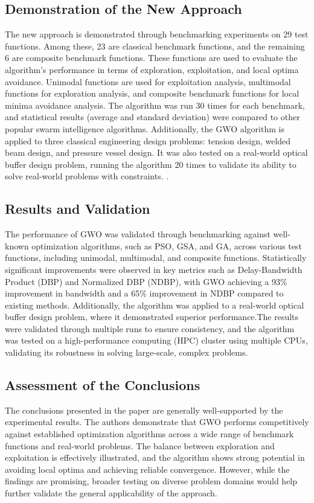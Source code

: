 \documentclass[a4paper, 12pt]{extarticle}
\begin{document}
\subsection{Demonstration of the New Approach}
The new approach is demonstrated through benchmarking experiments on 29 test functions. Among these, 23 are classical benchmark functions, and the remaining 6 are composite benchmark functions. These functions are used to evaluate the algorithm’s performance in terms of exploration, exploitation, and local optima avoidance. Unimodal functions are used for exploitation analysis, multimodal functions for exploration analysis, and composite benchmark functions for local minima avoidance analysis. The algorithm was run 30 times for each benchmark, and statistical results (average and standard deviation) were compared to other popular swarm intelligence algorithms.   Additionally, the GWO algorithm is applied to three classical engineering design problems: tension design, welded beam design, and pressure vessel design. It was also tested on a real-world optical buffer design problem, running the algorithm 20 times to validate its ability to solve real-world problems with constraints. \cite{mirjalili2016multi}.

\subsection{Results and Validation}
The performance of GWO was validated through benchmarking against well-known optimization algorithms, such as PSO, GSA, and GA, across various test functions, including unimodal, multimodal, and composite functions. Statistically significant improvements were observed in key metrics such as Delay-Bandwidth Product (DBP) and Normalized DBP (NDBP), with GWO achieving a 93\% improvement in bandwidth and a 65\% improvement in NDBP compared to existing methods. Additionally, the algorithm was applied to a real-world optical buffer design problem, where it demonstrated superior performance.The results were validated through multiple runs to ensure consistency, and the algorithm was tested on a high-performance computing (HPC) cluster using multiple CPUs, validating its robustness in solving large-scale, complex problems.

\subsection{Assessment of the Conclusions}
The conclusions presented in the paper are generally well-supported by the experimental results. The authors demonstrate that GWO performs competitively against established optimization algorithms across a wide range of benchmark functions and real-world problems. The balance between exploration and exploitation is effectively illustrated, and the algorithm shows strong potential in avoiding local optima and achieving reliable convergence. However, while the findings are promising, broader testing on diverse problem domains would help further validate the general applicability of the approach. 
\end{document}
